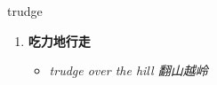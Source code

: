 
\begin{frame}
{\huge trudge}
\begin{center}
\begin{enumerate}\Large
  \item \textbf{吃力地行走}
  \begin{itemize}
    \item \em{\Large{trudge over the hill 翻山越岭}}
  \end{itemize}
\end{enumerate}
\end{center}
\end{frame}
